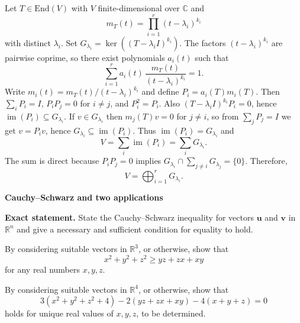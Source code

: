 \begin{solution}
Let $T\in\mathrm{End}(V)$ with $V$ finite-dimensional over $\mathbb C$ and
\[
m_T(t)=\prod_{i=1}^r (t-\lambda_i)^{k_i}
\]
with distinct $\lambda_i$.
Set $G_{\lambda_i}=\ker((T-\lambda_i I)^{k_i})$.
The factors $(t-\lambda_i)^{k_i}$ are pairwise coprime, so there exist polynomials $a_i(t)$ such that
\[
\sum_{i=1}^r a_i(t)\,\frac{m_T(t)}{(t-\lambda_i)^{k_i}}=1.
\]
Write $m_i(t)=m_T(t)/(t-\lambda_i)^{k_i}$ and define $P_i=a_i(T)m_i(T)$.
Then $\sum_i P_i=I$, $P_iP_j=0$ for $i\neq j$, and $P_i^2=P_i$.
Also $(T-\lambda_i I)^{k_i}P_i=0$, hence $\operatorname{im}(P_i)\subseteq G_{\lambda_i}$.
If $v\in G_{\lambda_i}$ then $m_j(T)v=0$ for $j\neq i$, so from $\sum_j P_j=I$ we get $v=P_iv$, hence $G_{\lambda_i}\subseteq\operatorname{im}(P_i)$.
Thus $\operatorname{im}(P_i)=G_{\lambda_i}$ and
\[
V=\sum_i \operatorname{im}(P_i)=\sum_i G_{\lambda_i}.
\]
The sum is direct because $P_iP_j=0$ implies $G_{\lambda_i}\cap\sum_{j\neq i}G_{\lambda_j}=\{0\}$.
Therefore,
\[
V=\bigoplus_{i=1}^r G_{\lambda_i}.
\]
\end{solution}

\begin{problem}[CP-I-0052]
\label{prob:cp-i-0052}
\textbf{Cauchy--Schwarz and two applications}

\textbf{Exact statement.}
\hspace*{1.5em}State the Cauchy--Schwarz inequality for vectors $\mathbf u$ and $\mathbf v$ in $\mathbb{R}^n$ and give a necessary and sufficient condition for equality to hold.

	\par\noindent\textbullet\quad By considering suitable vectors in $\mathbb{R}^3$, or otherwise, show that
	\[
	x^2+y^2+z^2 \ge yz+zx+xy
	\]
	for any real numbers $x,y,z$.
	\par\noindent\textbullet\quad By considering suitable vectors in $\mathbb{R}^4$, or otherwise, show that
	\[
	3(x^2+y^2+z^2+4)-2(yz+zx+xy)-4(x+y+z)=0
	\]
	holds for unique real values of $x,y,z$, to be determined.
\end{problem}

